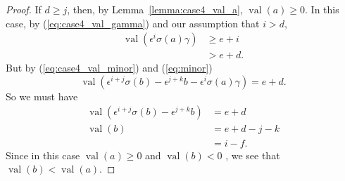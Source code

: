 \documentclass{amsart}
\theoremstyle{definition}
\def\e{\epsilon}
\def\val{\mathop{\mathrm{val}}}
\def\s{\sigma}
\begin{document}
\begin{proof}
    If $d \ge j$, then, by Lemma~\ref{lemma:case4_val_a}, $\val(a) \ge 0$.  In
    this case, by (\ref{eq:case4_val_gamma}) and our assumption that $i >d$,
    \begin{align*}
      \val(\e^i \s(a)\gamma) &\ge e + i \\
                    &> e + d.
    \end{align*}
    But by (\ref{eq:case4_val_minor}) and (\ref{eq:minor})
    \begin{equation}
      \label{eq:case4_expand_minor}
      \val(\e^{i+j}\s(b) - \e^{j+k}b - \e^i\s(a)\gamma) = e + d.
    \end{equation}
    So we must have
    \begin{align*}
      \val(\e^{i+j}\s(b) - \e^{j+k}b) &= e + d \\
      \val(b) &= e + d - j - k \\
              &= i - f.
    \end{align*}
    Since in this case $\val(a) \ge 0$ and $\val(b) < 0$ , we see that $\val(b)
    < \val(a)$.
  \end{proof}
\end{document}
